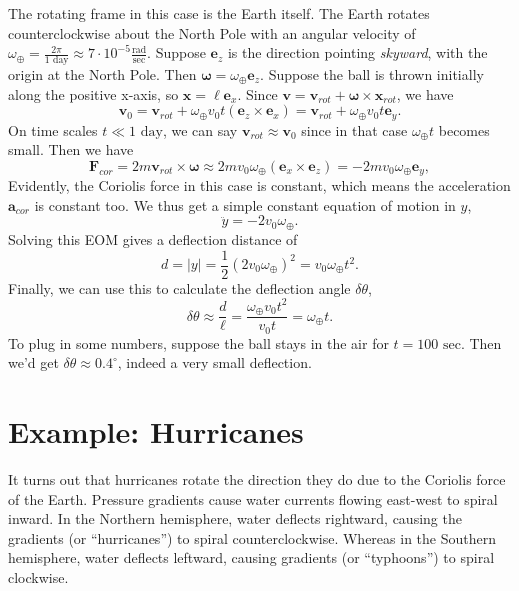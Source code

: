 \documentclass[
  letterpaper,
  DIV=11,
  numbers=noendperiod]{scrreprt}
\begin{document}
The rotating frame in this case is the Earth itself. The Earth rotates
counterclockwise about the North Pole with an angular velocity of
\(\omega_\oplus = \frac{2\pi}{\text{1 day}} \approx 7 \cdot 10^{-5} \frac{\text{rad}}{\text{sec}}\).
Suppose \(\mathbf{e}_z\) is the direction pointing \emph{skyward}, with
the origin at the North Pole. Then
\(\boldsymbol{\omega} = \omega_{\oplus} \mathbf{e}_z\). Suppose the ball
is thrown initially along the positive x-axis, so
\(\mathbf{x} = \ell \mathbf{e}_x\). Since
\(\mathbf{v} = \mathbf{v}_{rot} + \boldsymbol{\omega} \times \mathbf{x}_{rot}\),
we have \[
\mathbf{v}_0 = \mathbf{v}_{rot} + \omega_{\oplus} v_0 t (\mathbf{e}_z \times \mathbf{e}_x) = \mathbf{v}_{rot} + \omega_{\oplus} v_0 t \mathbf{e}_y.
\] On time scales \(t \ll \text{1 day}\), we can say
\(\mathbf{v}_{rot} \approx \mathbf{v}_0\) since in that case
\(\omega_{\oplus} t\) becomes small. Then we have \[
\mathbf{F}_{cor} = 2m \mathbf{v}_{rot} \times \boldsymbol{\omega} \approx 2m v_0 \omega_{\oplus} (\mathbf{e}_x \times \mathbf{e}_z) = -2m v_0 \omega_{\oplus} \mathbf{e}_y,
\] Evidently, the Coriolis force in this case is constant, which means
the acceleration \(\mathbf{a}_{cor}\) is constant too. We thus get a
simple constant equation of motion in \(y\), \[
\ddot y = -2v_0 \omega_{\oplus}.
\] Solving this EOM gives a deflection distance of \[
d = |y| = \frac{1}{2}(2v_0 \omega_{\oplus})^2 = v_0 \omega_{\oplus} t^2.
\] Finally, we can use this to calculate the deflection angle
\(\delta\theta\), \[
\delta\theta \approx \frac{d}{\ell} = \frac{\omega_{\oplus}v_0 t^2}{v_0 t} = \omega_{\oplus} t.
\] To plug in some numbers, suppose the ball stays in the air for
\(t = \text{100 sec}\). Then we'd get
\(\delta\theta \approx 0.4^\circ\), indeed a very small deflection.

\hypertarget{example-hurricanes}{%
\section{Example: Hurricanes}\label{example-hurricanes}}

It turns out that hurricanes rotate the direction they do due to the
Coriolis force of the Earth. Pressure gradients cause water currents
flowing east-west to spiral inward. In the Northern hemisphere, water
deflects rightward, causing the gradients (or ``hurricanes'') to spiral
counterclockwise. Whereas in the Southern hemisphere, water deflects
leftward, causing gradients (or ``typhoons'') to spiral clockwise.
\end{document}
